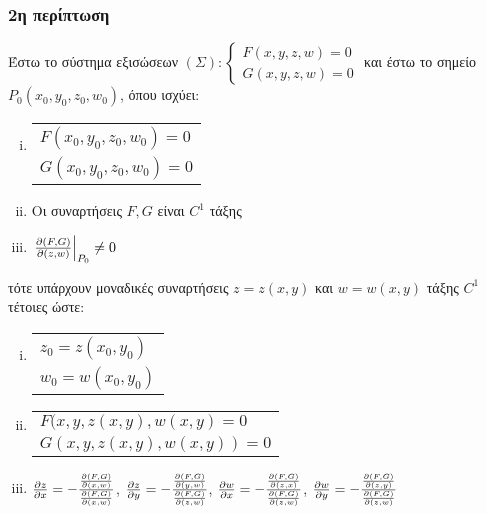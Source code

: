 \subsubsection{2η περίπτωση}

Έστω το σύστημα εξισώσεων $(\Sigma):
	\begin{cases}
		F(x,y,z,w) = 0  \\
		G(x,y,z,w) = 0
	\end{cases}$
	και έστω το σημείο $ P_0(x_0,y_0,z_0,w_0) $, όπου ισχύει:
	\begin{enumerate}[(i)]
		\item  \begin{tabular}{l}
				$F(x_0,y_0,z_0,w_0) = 0$ \\
				$G(x_0,y_0,z_0,w_0) = 0$
			\end{tabular}
		\item Οι συναρτήσεις $ F, G $ είναι $ C^{1} $ τάξης 
		\item $ \left.\pdv{(F,G)}{(z,w)}\right|_{P_0} \neq 0 $ 
	\end{enumerate}
	τότε υπάρχουν μοναδικές συναρτήσεις $ z = z(x,y) $ και $ w = w(x,y) $ τάξης $ C^{1} $ τέτοιες
	ώστε:
	\begin{enumerate}[(i)]
		\item \begin{tabular}{l}
				$ z_0 = z(x_0,y_0) $ \\
				$ w_0 = w(x_0,y_0) $
			\end{tabular}
		\item \begin{tabular}{l}
				$ F(x,y,z(x,y), w(x,y) = 0 $ \\
			$ G(x,y,z(x,y), w(x,y)) = 0 $
		\end{tabular}
	\item $ \pdv{z}{x} = - \frac{\pdv{(F,G)}{(x,w)}}{\pdv{(F,G)}{(x,w)}} $, $ \pdv{z}{y} = -
		\frac{\pdv{(F,G)}{(y,w)}}{\pdv{(F,G)}{(z,w)}} $, $ \pdv{w}{x} = -
		\frac{\pdv{(F,G)}{(z,x)}}{\pdv{(F,G)}{(z,w)}} $, $ \pdv{w}{y} = -
		\frac{\pdv{(F,G)}{(z,y)}}{\pdv{(F,G)}{(z,w)}} $
	\end{enumerate}

